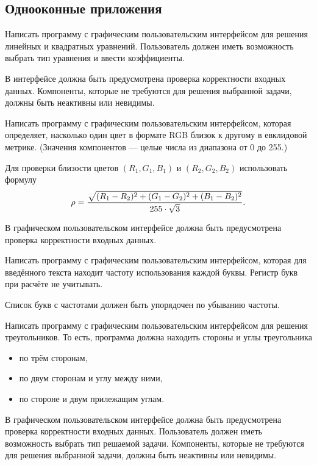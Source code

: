 
\subsection{Однооконные приложения}

\task Написать программу с графическим пользовательским интерфейсом
для решения линейных и квадратных уравнений. Пользователь должен иметь
возможность выбрать тип уравнения и ввести коэффициенты.

В интерфейсе должна быть предусмотрена проверка корректности входных
данных. Компоненты, которые не требуются для решения выбранной задачи,
должны быть неактивны или невидимы.

\task Написать программу с графическим пользовательским интерфейсом,
которая определяет, насколько один цвет в формате RGB близок к другому
в евклидовой метрике. (Значения компонентов — целые числа из диапазона
от 0 до 255.)

Для проверки близости цветов $(R_1, G_1, B_1)$ и $(R_2, G_2, B_2)$
использовать формулу
\[
\rho = {\sqrt{(R_1-R_2)^2 + (G_1-G_2)^2 + (B_1-B_2)^2} \over 255 \cdot \sqrt{3}}.
\]

В графическом пользовательском интерфейсе должна быть предусмотрена
проверка корректности входных данных.

\task Написать программу с графическим пользовательским интерфейсом,
которая для введённого текста находит частоту использования каждой
буквы. Регистр букв при расчёте не учитывать.

Список букв с частотами должен быть упорядочен по убыванию частоты.

\task Написать программу с графическим пользовательским интерфейсом
для решения треугольников. То есть, программа должна находить стороны
и углы треугольника
\begin{itemize}
\item по трём сторонам,
\item по двум сторонам и углу между ними,
\item по стороне и двум прилежащим углам.
\end{itemize}

В графическом пользовательском интерфейсе должна быть предусмотрена
проверка корректности входных данных. Пользователь должен иметь
возможность выбрать тип решаемой задачи. Компоненты, которые не
требуются для решения выбранной задачи, должны быть неактивны или
невидимы.

